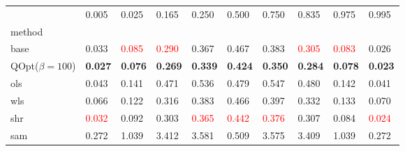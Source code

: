 \begin{tabular}{llllllllll}
\toprule
 & 0.005 & 0.025 & 0.165 & 0.250 & 0.500 & 0.750 & 0.835 & 0.975 & 0.995 \\
method &  &  &  &  &  &  &  &  &  \\
\midrule
base & 0.033 & \textcolor{red}{0.085} & \textcolor{red}{0.290} & 0.367 & 0.467 & 0.383 & \textcolor{red}{0.305} & \textcolor{red}{0.083} & 0.026 \\
\midrule
QOpt($\beta=100$) & \textbf{0.027} & \textbf{0.076} & \textbf{0.269} & \textbf{0.339} & \textbf{0.424} & \textbf{0.350} & \textbf{0.284} & \textbf{0.078} & \textbf{0.023} \\
ols & 0.043 & 0.141 & 0.471 & 0.536 & 0.479 & 0.547 & 0.480 & 0.142 & 0.041 \\
wls & 0.066 & 0.122 & 0.316 & 0.383 & 0.466 & 0.397 & 0.332 & 0.133 & 0.070 \\
shr & \textcolor{red}{0.032} & 0.092 & 0.303 & \textcolor{red}{0.365} & \textcolor{red}{0.442} & \textcolor{red}{0.376} & 0.307 & 0.084 & \textcolor{red}{0.024} \\
sam & 0.272 & 1.039 & 3.412 & 3.581 & 0.509 & 3.575 & 3.409 & 1.039 & 0.272 \\
\bottomrule
\end{tabular}